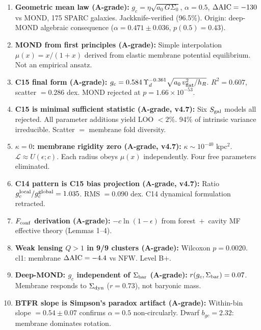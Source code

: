 \documentclass[11pt,a4paper]{article}
\newcommand{\e}[1]{\times 10^{#1}}
\newcommand{\gc}{g_{c}}
\newcommand{\ao}{a_{0}}
\newcommand{\vflat}{v_{\rm flat}}
\newcommand{\hR}{h_{R}}
\newcommand{\Yd}{\Upsilon_{d}}
\newcommand{\sigdyn}{\Sigma_{\rm dyn}}
\newcommand{\sigbar}{\Sigma_{\rm bar}}
\newcommand{\kap}{\kappa}
\newcommand{\Sgal}{S_{\rm gal}}
\newcommand{\AIC}{\Delta{\rm AIC}}
\begin{document}
\begin{enumerate}[leftmargin=*,itemsep=4pt,label=\textbf{\arabic*.}]
\item \textbf{Geometric mean law (A-grade):} $\gc = \eta\sqrt{\ao\,G\Sigma_0}$, $\alpha = 0.5$,
$\AIC = -130$ vs MOND, 175 SPARC galaxies. Jackknife-verified (96.5\%). Origin: deep-MOND algebraic
consequence ($\alpha = 0.471 \pm 0.036$, $p(0.5) = 0.43$).

\item \textbf{MOND from first principles (A-grade):} Simple interpolation $\mu(x) = x/(1+x)$ derived from
elastic membrane potential equilibrium. Not an empirical ansatz.

\item \textbf{C15 final form (A-grade):} $\gc = 0.584\,\Yd^{-0.361}\sqrt{\ao\,\vflat^2/\hR}$.
$R^2 = 0.607$, scatter $= 0.286$ dex. MOND rejected at $p = 1.66\e{-53}$.

\item \textbf{C15 is minimal sufficient statistic (A-grade, v4.7):} Six $\Sgal$ models all rejected. All
parameter additions yield LOO $< 2\%$. 94\% of intrinsic variance irreducible. Scatter $=$ membrane fold diversity.

\item \textbf{$\kap = 0$: membrane rigidity zero (A-grade, v4.7):} $\kap \sim 10^{-40}$ kpc$^2$.
$\mathcal{L} \approx U(\epsilon; c)$. Each radius obeys $\mu(x)$ independently. Four free parameters eliminated.

\item \textbf{C14 pattern is C15 bias projection (A-grade, v4.7):} Ratio $\gc^{\rm local}/\gc^{\rm global} =
1.035$. RMS $= 0.090$ dex. C14 dynamical formulation retracted.

\item \textbf{$F_{\rm conf}$ derivation (A-grade):} $-c\ln(1 - \epsilon)$ from forest~$+$~cavity MF effective
theory (Lemmas 1--4).

\item \textbf{Weak lensing $Q > 1$ in 9/9 clusters (A-grade):} Wilcoxon $p = 0.0020$. cl1: membrane
$\AIC = -4.4$ vs NFW. Level B$+$.

\item \textbf{Deep-MOND: $\gc$ independent of $\sigbar$ (A-grade):} $r(\gc, \sigbar) = 0.07$. Membrane
responds to $\sigdyn$ ($r = 0.73$), not baryonic mass.

\item \textbf{BTFR slope is Simpson's paradox artifact (A-grade):} Within-bin slope $= 0.54 \pm 0.07$
confirms $\alpha = 0.5$ non-circularly. Dwarf $b_{gc} = 2.32$: membrane dominates rotation.


\end{enumerate}
\end{document}
